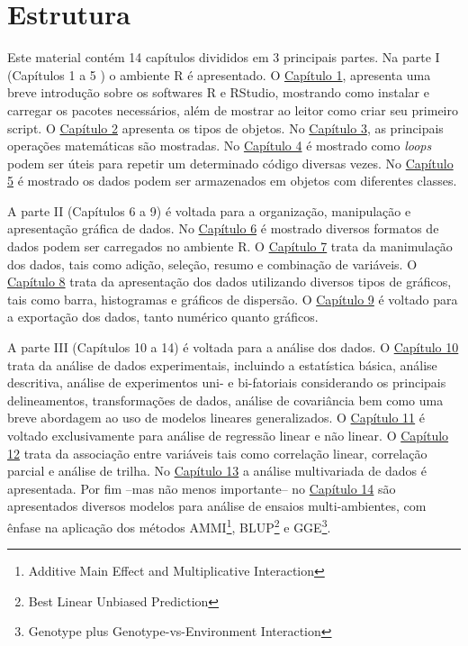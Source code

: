 \documentclass[
]{book}
\begin{document}
\hypertarget{estrutura}{%
\section*{Estrutura}\label{estrutura}}

Este material contém 14 capítulos divididos em 3 principais partes. Na parte I (Capítulos 1 a 5 ) o ambiente R é apresentado. O \protect\hyperlink{intro}{Capítulo 1}, apresenta uma breve introdução sobre os softwares R e RStudio, mostrando como instalar e carregar os pacotes necessários, além de mostrar ao leitor como criar seu primeiro script. O \protect\hyperlink{objects}{Capítulo 2} apresenta os tipos de objetos. No \protect\hyperlink{math}{Capítulo 3}, as principais operações matemáticas são mostradas. No \protect\hyperlink{loops}{Capítulo 4} é mostrado como \emph{loops} podem ser úteis para repetir um determinado código diversas vezes. No \protect\hyperlink{dataframe}{Capítulo 5} é mostrado os dados podem ser armazenados em objetos com diferentes classes.

A parte II (Capítulos 6 a 9) é voltada para a organização, manipulação e apresentação gráfica de dados. No \protect\hyperlink{entrada}{Capítulo 6} é mostrado diversos formatos de dados podem ser carregados no ambiente R. O \protect\hyperlink{manipula}{Capítulo 7} trata da manimulação dos dados, tais como adição, seleção, resumo e combinação de variáveis. O \protect\hyperlink{graph}{Capítulo 8} trata da apresentação dos dados utilizando diversos tipos de gráficos, tais como barra, histogramas e gráficos de dispersão. O \protect\hyperlink{exporta}{Capítulo 9} é voltado para a exportação dos dados, tanto numérico quanto gráficos.

A parte III (Capítulos 10 a 14) é voltada para a análise dos dados. O \protect\hyperlink{analdata}{Capítulo 10} trata da análise de dados experimentais, incluindo a estatística básica, análise descritiva, análise de experimentos uni- e bi-fatoriais considerando os principais delineamentos, transformações de dados, análise de covariância bem como uma breve abordagem ao uso de modelos lineares generalizados. O \protect\hyperlink{reg}{Capítulo 11} é voltado exclusivamente para análise de regressão linear e não linear. O \protect\hyperlink{relations}{Capítulo 12} trata da associação entre variáveis tais como correlação linear, correlação parcial e análise de trilha. No \protect\hyperlink{multivariate}{Capítulo 13} a análise multivariada de dados é apresentada. Por fim --mas não menos importante-- no \protect\hyperlink{interaction}{Capítulo 14} são apresentados diversos modelos para análise de ensaios multi-ambientes, com ênfase na aplicação dos métodos AMMI\footnote{Additive Main Effect and Multiplicative Interaction}, BLUP\footnote{Best Linear Unbiased Prediction} e GGE\footnote{Genotype plus Genotype-vs-Environment Interaction}.
\end{document}
